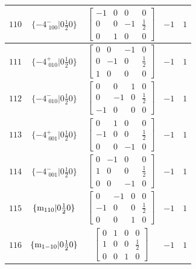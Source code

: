 \documentclass[fleqn,8pt]{jsarticle}
\begin{document}
\begin{longtable}{ccccc}
$ 110 $ & $ \{-4^{-}_{\,\,100}|0 \frac{1}{2} 0\} $ & $ \begin{bmatrix} -1 & 0 & 0 & 0 \\ 0 & 0 & -1 & \frac{1}{2} \\ 0 & 1 & 0 & 0 \end{bmatrix} $ & $ -1 $ & $ 1 $ \\ \hline
$ 111 $ & $ \{-4^{+}_{\,\,010}|0 \frac{1}{2} 0\} $ & $ \begin{bmatrix} 0 & 0 & -1 & 0 \\ 0 & -1 & 0 & \frac{1}{2} \\ 1 & 0 & 0 & 0 \end{bmatrix} $ & $ -1 $ & $ 1 $ \\ \hline
$ 112 $ & $ \{-4^{-}_{\,\,010}|0 \frac{1}{2} 0\} $ & $ \begin{bmatrix} 0 & 0 & 1 & 0 \\ 0 & -1 & 0 & \frac{1}{2} \\ -1 & 0 & 0 & 0 \end{bmatrix} $ & $ -1 $ & $ 1 $ \\ \hline
$ 113 $ & $ \{-4^{+}_{\,\,001}|0 \frac{1}{2} 0\} $ & $ \begin{bmatrix} 0 & 1 & 0 & 0 \\ -1 & 0 & 0 & \frac{1}{2} \\ 0 & 0 & -1 & 0 \end{bmatrix} $ & $ -1 $ & $ 1 $ \\ \hline
$ 114 $ & $ \{-4^{-}_{\,\,001}|0 \frac{1}{2} 0\} $ & $ \begin{bmatrix} 0 & -1 & 0 & 0 \\ 1 & 0 & 0 & \frac{1}{2} \\ 0 & 0 & -1 & 0 \end{bmatrix} $ & $ -1 $ & $ 1 $ \\ \hline
$ 115 $ & $ \{{\rm m}_{110}|0 \frac{1}{2} 0\} $ & $ \begin{bmatrix} 0 & -1 & 0 & 0 \\ -1 & 0 & 0 & \frac{1}{2} \\ 0 & 0 & 1 & 0 \end{bmatrix} $ & $ -1 $ & $ 1 $ \\ \hline
$ 116 $ & $ \{{\rm m}_{1-10}|0 \frac{1}{2} 0\} $ & $ \begin{bmatrix} 0 & 1 & 0 & 0 \\ 1 & 0 & 0 & \frac{1}{2} \\ 0 & 0 & 1 & 0 \end{bmatrix} $ & $ -1 $ & $ 1 $ \\ \hline

\end{longtable}
\end{document}
